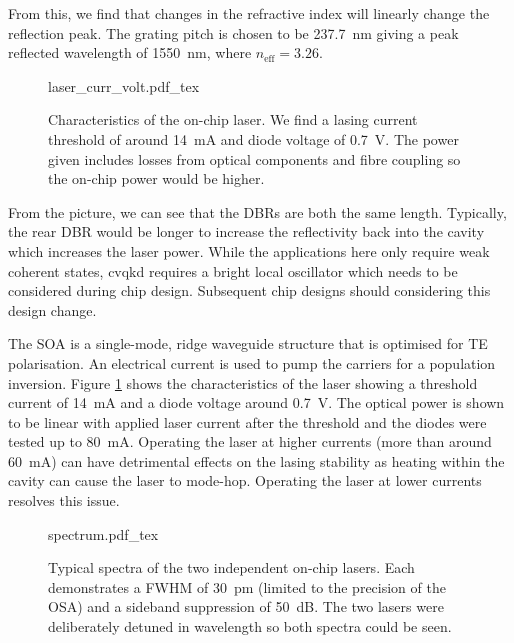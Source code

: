 From this, we find that changes in the refractive index will linearly change the reflection peak. The grating pitch is chosen to be \SI{237.7}{nm} giving a peak reflected wavelength of \SI{1550}{nm}, where $n_\text{eff} = 3.26$.

\begin{figure}[tp]
	\centering
	\tiny
	\def\svgwidth{\textwidth} 
	{laser_curr_volt.pdf_tex}
	\caption[Lasing current threshold and voltage]{Characteristics of the on-chip laser. We find a lasing current threshold of around \SI{14}{mA} and diode voltage of \SI{0.7}{V}. The power given includes losses from optical components and fibre coupling so the on-chip power would be higher.}
	\label{fig:las_curr_volt}
\end{figure}

From the picture, we can see that the \acp{DBR} are both the same length. Typically, the rear \ac{DBR} would be longer to increase the reflectivity back into the cavity which increases the laser power. While the applications here only require weak coherent states, \ac{cvqkd} requires a bright local oscillator which needs to be considered during chip design. Subsequent chip designs should considering this design change.

The \ac{SOA} is a single-mode, ridge waveguide structure that is optimised for TE polarisation. An electrical current is used to pump the carriers for a population inversion. Figure \ref{fig:las_curr_volt} shows the characteristics of the laser showing a threshold current of \SI{14}{\mA} and a diode voltage around \SI{0.7}{V}. The optical power is shown to be linear with applied laser current after the threshold and the diodes were tested up to \SI{80}{\mA}. Operating the laser at higher currents (more than around \SI{60}{\mA}) can have detrimental effects on the lasing stability as heating within the cavity can cause the laser to mode-hop. Operating the laser at lower currents resolves this issue.


\begin{figure}[tp]
	\centering
	\small
	\def\svgwidth{0.8\textwidth} 
	{spectrum.pdf_tex}
	\caption[On-chip laser spectra]{Typical spectra of the two independent on-chip lasers. Each demonstrates a \ac{FWHM} of \SI{30}{pm} (limited to the precision of the \ac{OSA}) and a sideband suppression of \SI{50}{dB}. The two lasers were deliberately detuned in wavelength so both spectra could be seen.}
	\label{fig:spectra}
\end{figure}

